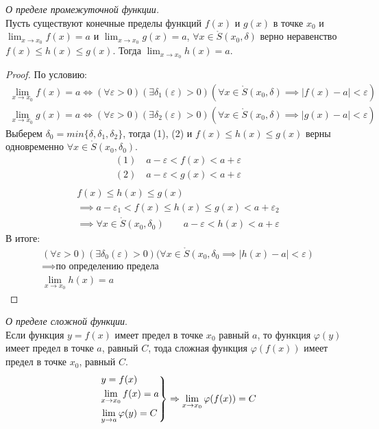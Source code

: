 \begin{theorem}
  \textit{О пределе промежуточной функции.} \\
  Пусть существуют конечные пределы функций $f(x)$ и $g(x)$ в точке  $x_0$ и $\lim_{x \to x_0} f(x) = a$ и $\lim_{x \to x_0} g(x) = a$, $\forall x \in \mathring{S}(x_0, \delta)$ верно неравенство $f(x) \le h(x) \le g(x)$. Тогда $\lim_{x \to x_0} h(x) = a$.
\end{theorem}
\begin{proof}
  По условию: 
  \begin{gather*}
    \lim_{x \to x_0} f(x) = a \iff (\forall \varepsilon > 0)(\exists \delta_1(\varepsilon) > 0)(\forall x \in \mathring{S}(x_0, \delta) \implies |f(x) - a| < \varepsilon) \tag{1} \\
    \lim_{x \to x_0} g(x) = a \iff (\forall \varepsilon > 0)(\exists \delta_2(\varepsilon) > 0)(\forall x \in \mathring{S}(x_0, \delta) \implies |g(x) - a| < \varepsilon) \tag{2}
  \end{gather*}
  Выберем $\delta_0 = min \{\delta, \delta_1, \delta_2\}$, тогда (1), (2) и $f(x) \le h(x) \le g(x)$ верны одновременно $\forall x \in \mathring{S}(x_0, \delta_0)$.
  \begin{align*}
    (1) \quad a - \varepsilon < f(x) < a + \varepsilon \\
    (2) \quad a - \varepsilon < g(x) < a + \varepsilon \\
  \end{align*}
  \begin{gather*}
    f(x) \le h(x) \le g(x) \\
    \implies a - \varepsilon_1 < f(x) \le h(x) \le g(x) < a + \varepsilon_2 \\
    \implies \forall x \in \mathring{S}(x_0, \delta_0) \qquad a - \varepsilon < h(x) < a + \varepsilon
  \end{gather*}
  В итоге:
  \begin{gather*}
    (\forall \varepsilon > 0)(\exists \delta_0(\varepsilon) > 0)(\forall x \in \mathring{S}(x_0, \delta_0 \implies |h(x) - a| < \varepsilon) \\
    \implies \text{по определению предела} \\
    \lim_{x \to x_0} h(x) = a
  \end{gather*}
\end{proof}

\begin{theorem}
  \textit{О пределе сложной функции}. \\
  Если функция $y = f(x)$ имеет предел в точке  $x_0$ равный $a$, то функция  $\varphi(y)$ имеет предел в точке $a$, равный $C$, тода сложная функция  $\varphi(f(x))$ имеет предел в точке $x_0$, равный $C$.
  \begin{gather*}
    \begin{rcases}
      y = f(x) \\
      \lim_{x \to x_0} f(x) = a \\
      \lim_{y \to a} \varphi(y) = C \\
    \end{rcases}
    \implies \lim_{x \to x_0} \varphi(f(x)) = C
  \end{gather*}
\end{theorem}

